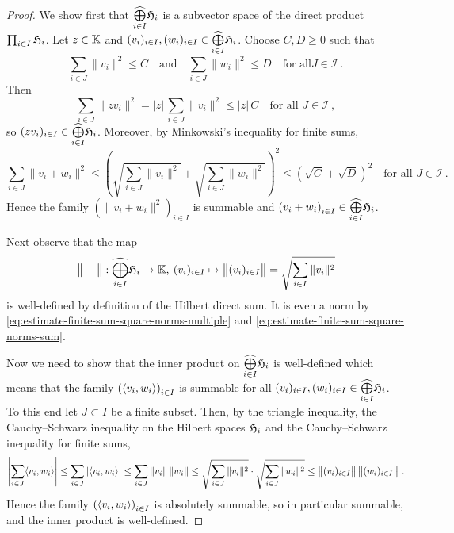 \begin{proof}
  We show first that $\widehat{\bigoplus\limits_{i\in I}} \mathfrak{H}_i$ is a subvector space of
  the direct product $\prod_{i\in I} \mathfrak{H}_i$.  
  Let $z\in \mathbb{K}$ and $(v_i)_{i\in I}, (w_i)_{i\in I}\in \widehat{\bigoplus\limits_{i\in I}} \mathfrak{H}_i$.
  Choose $C,D \geq 0$ such that
  \[
    \sum_{i\in J} \|v_i\|^2 \leq C \quad\text{and}\quad
    \sum_{i\in J} \|w_i\|^2 \leq D \quad\text{for all} J \in \mathscr{I} \ .
  \]
  Then
  \begin{equation}
    \label{eq:estimate-finite-sum-square-norms-multiple}
    \sum_{i\in J} \|z v_i\|^2 = |z| \, \sum_{i\in J} \| v_i\|^2\leq |z| \, C \quad
    \text{for all } J\in \mathscr{I} \ ,
  \end{equation}
  so $(zv_i)_{i\in I} \in \widehat{\bigoplus\limits_{i\in I}} \mathfrak{H}_i$. 
  Moreover, by Minkowski's inequality for finite sums,
  \begin{equation}
    \label{eq:estimate-finite-sum-square-norms-sum}
    \sum_{i\in J} \|v_i + w_i\|^2 \leq
    \left( \sqrt{\sum_{i\in J} \|v_i\|^2} +  \sqrt{\sum_{i\in J} \| w_i\|^2} \right)^2
    \leq \left( \sqrt{C} + \sqrt{D} \right)^2 \quad\text{for all } J\in \mathscr{I} \ .
  \end{equation}
  Hence the family $\left( \| v_i + w_i\|^2 \right)_{i\in I}$ is summable and
  $\left( v_i + w_i \right)_{i\in I} \in \widehat{\bigoplus\limits_{i\in I}} \mathfrak{H}_i$. 
  
  Next observe that the map
  \[
    \big\| - \big\| : \widehat{\bigoplus\limits_{i\in I}} \mathfrak{H}_i \to \mathbb{K},
    \: (v_i)_{i\in I} \mapsto \big\| (v_i)_{i\in I}  \big\| = \sqrt{\sum_{i\in I} \| v_i\|^2} 
  \]
  is well-defined by definition of the Hilbert direct sum. It is even a norm
  by \eqref{eq:estimate-finite-sum-square-norms-multiple} and
  \eqref{eq:estimate-finite-sum-square-norms-sum}. 
    
  Now we need to show that the inner product on $\widehat{\bigoplus\limits_{i\in I}} \mathfrak{H}_i$
  is well-defined which means that the family $\left( \langle v_i,w_i \rangle \right)_{i\in I}$ is summable
  for all $(v_i)_{i\in I} ,  (w_i)_{i\in I} \in \widehat{\bigoplus\limits_{i\in I}} \mathfrak{H}_i$.
  To this end let $J\subset I$ be a finite subset. Then, by the triangle inequality, 
  the Cauchy--Schwarz inequality on the Hilbert spaces $\mathfrak{H}_i$ and the
  Cauchy--Schwarz inequality for finite sums,
  \[
    \left| \sum_{i\in J} \langle v_i,w_i \rangle \right| \leq
    \sum_{i\in J} \left| \langle v_i,w_i \rangle \right| \leq
    \sum_{i\in J} \| v_i\| \, \| w_i\| \leq
    \sqrt{\sum_{i\in J} \| v_i\|^2} \cdot \sqrt{\sum_{i\in J} \| w_i\|^2}
    \leq \big\| (v_i)_{i\in I}  \big\| \, \big\| (w_i)_{i\in I}  \big\| \ .
  \]
  Hence the family $\left( \langle v_i,w_i \rangle \right)_{i\in I}$ is absolutely summable, so in particular
  summable, and the inner product is well-defined.


\end{proof}
